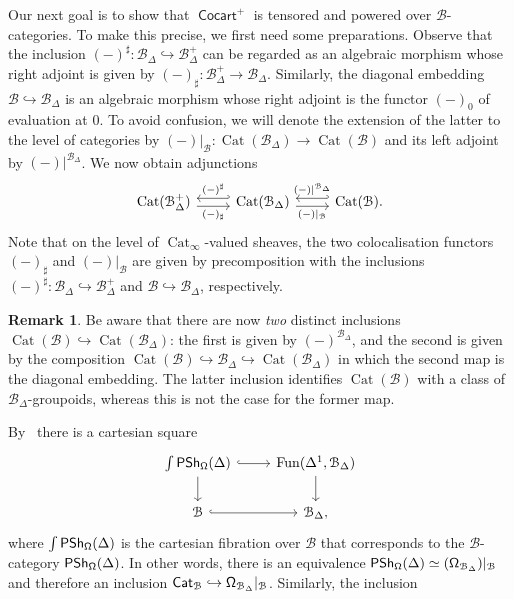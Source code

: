 \documentclass[reqno]{amsart}
\numberwithin{equation}{subsection}
\theoremstyle{plain}
\theoremstyle{definition}
\newtheorem{remark}[equation]{Remark}
\let\scr=\mathcal
\let\into=\hookrightarrow
\def\BB{\scr B}
\DeclareMathOperator{\IPSh}{\mathsf{PSh}}
\DeclareMathOperator{\Cat}{Cat}
\DeclareMathOperator{\ICat}{\mathsf{Cat}}
\DeclareMathOperator{\ICocart}{\mathsf{Cocart}}
\DeclareMathOperator{\Fun}{Fun}
\newcommand{\Simp}[1]{#1_{\Delta}}
\newcommand{\mSimp}[1]{#1_{\Delta}^+}
\newcommand{\CatS}{\Cat_{\infty}}
\begin{document}
Our next goal is to show that $\ICocart^+$ is tensored and powered over $\BB$-categories. To make this precise, we first need some preparations. Observe that the inclusion $(-)^\sharp\colon\Simp\BB\into\mSimp\BB$ can be regarded as an algebraic morphism whose right adjoint is given by $(-)_\sharp\colon \mSimp\BB\to\Simp\BB$. Similarly,  the diagonal embedding $\BB\into\Simp\BB$ is an algebraic morphism whose right adjoint is the functor $(-)_0$ of evaluation at $0$. To avoid confusion, we will denote the extension of the latter to the level of categories by $(-)\vert_\BB\colon \Cat(\Simp\BB)\to\Cat(\BB)$ and its left adjoint by $(-)\vert^{\Simp\BB}$. We now obtain adjunctions
\begin{equation*}
\begin{tikzcd}
	\Cat(\mSimp\BB)\arrow[r, shift right=1mm, "(-)_\sharp"']\arrow[r, shift left=1mm, hookleftarrow, "(-)^\sharp"]& \Cat(\Simp\BB)\arrow[r, shift right=1mm, "(-)\vert_\BB"']\arrow[r, shift left=1mm, hookleftarrow, "(-)\vert^{\Simp\BB}"] & \Cat(\BB).
\end{tikzcd}
\end{equation*}
Note that on the level of $\CatS$-valued sheaves, the two colocalisation functors $(-)_\sharp$ and $(-)\vert_\BB$ are given by precomposition with the inclusions $(-)^\sharp\colon \Simp\BB\into\mSimp\BB$ and $\BB\into\Simp\BB$, respectively.
\begin{remark}
	\label{rem:Warning}
	Be aware that there are now \emph{two} distinct inclusions $\Cat(\BB)\into\Cat(\Simp\BB)$: the first is given by $(-)^{\Simp\BB}$, and the second is given by the composition $\Cat(\BB)\into\Simp\BB\into\Cat(\Simp\BB)$ in which the second map is the diagonal embedding. The latter inclusion identifies $\Cat(\BB)$ with a class of $\Simp\BB$-groupoids, whereas this is not the case for the former map.
\end{remark}
By~\cite[Lemma~3.7.4]{Martini2021} there is a cartesian square
\begin{equation*}
\begin{tikzcd}
\int \IPSh_{\Univ}(\Delta)\arrow[r, hookrightarrow] \arrow[d] & \Fun(\Delta^1, \Simp\BB)\arrow[d]\\
\BB\arrow[r, hookrightarrow] & \Simp\BB, 
\end{tikzcd}
\end{equation*}
where $\int \IPSh_{\Univ}(\Delta)$ is the cartesian fibration over $\BB$ that corresponds to the $\BB$-category $\IPSh_{\Univ}(\Delta)$. In other words, there is an equivalence $\IPSh_{\Univ}(\Delta)\simeq( \Univ[\Simp\BB])\vert_{\BB}$ and therefore an inclusion $\ICat_{\BB}\into \Univ[\Simp\BB]\vert_{\BB}$. Similarly, the inclusion
\end{document}
